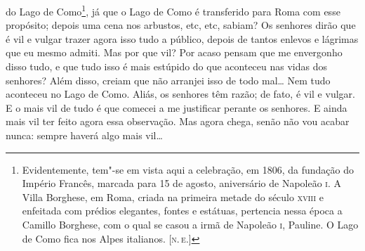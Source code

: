 do Lago de Como\footnote{Evidentemente, tem"-se em vista aqui a
  celebração, em 1806, da fundação do Império Francês, marcada para 15
  de agosto, aniversário de Napoleão \textsc{i}. A Villa Borghese, em Roma,
  criada na primeira metade do século \textsc{xviii} e enfeitada com prédios
  elegantes, fontes e estátuas, pertencia nessa época a Camillo
  Borghese, com o qual se casou a irmã de Napoleão \textsc{i}, Pauline. O Lago de
  Como fica nos Alpes italianos. {[}\textsc{n.\,e.}{]}}, já que o Lago de Como é
transferido para Roma com esse propósito; depois uma cena nos arbustos,
etc, etc, sabiam? Os senhores dirão que é vil e vulgar trazer agora isso
tudo a público, depois de tantos enlevos e lágrimas que eu mesmo admiti.
Mas por que vil? Por acaso pensam que me envergonho disso tudo, e que
tudo isso é mais estúpido do que aconteceu nas vidas dos senhores? Além
disso, creiam que não arranjei isso de todo mal\ldots{} Nem tudo aconteceu no
Lago de Como. Aliás, os senhores têm razão; de fato, é vil e vulgar. E o
mais vil de tudo é que comecei a me justificar perante os senhores. E
ainda mais vil ter feito agora essa observação. Mas agora chega, senão
não vou acabar nunca: sempre haverá algo mais vil\ldots{}

